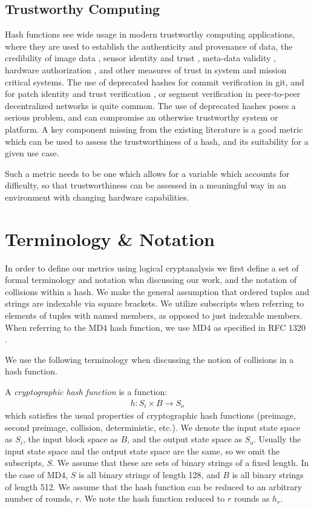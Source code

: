 \documentclass[conference]{IEEEtran}
\begin{document}
\subsection{Trustworthy Computing}

Hash functions see wide usage in modern trustworthy computing
applications, where they are used to establish the authenticity and
provenance of data, the credibility of image data
\cite{friedman1993trustworthy}, sensor identity and trust
\cite{wong2006dynamic}, meta-data validity \cite{bayer1993improving},
hardware authorization \cite{sirer2011logical}, and other measures of
trust in system and mission critical systems.
The use of deprecated hashes for commit verification in
git\cite{loeliger2012version}, and for patch identity and trust
verification \cite{kuhn2005secure}, or segment verification in
peer-to-peer decentralized networks \cite{lua2005survey} is quite
common.  The use of deprecated hashes poses a serious problem, and can
compromise an otherwise trustworthy system or platform.  A key
component missing from the existing literature is a good metric which
can be used to assess the trustworthiness of a hash, and its
suitability for a given use case.

Such a metric needs to be one which allows for a variable which
accounts for difficulty, so that trustworthiness can be assessed in a
meaningful way in an environment with changing hardware capabilities.

\section{Terminology \& Notation}  \label{Sec:Terminology}

In order to define our metrics using logical cryptanalysis
we first define a set of formal terminology and notation whn
discussing our work, and the notation of collisions within a hash.
We make the general assumption that ordered tuples and strings are
indexable via square brackets. We utilize subscripts when referring to
elements of tuples with named members, as opposed to just indexable
members.  When referring to the MD4 hash function, we use MD4 as
specified in RFC 1320 \cite{rfc1320}.

We use the following terminology when discussing the notion of collisions in
a hash function.

A \textit{cryptographic hash function} is a function:
\begin{align*}
  h: S_{i} \times B \rightarrow S_{o}
\end{align*}
which satisfies the usual properties of cryptographic hash functions
(preimage, second preimage, collision, deterministic, etc.). We denote
the input state space as $S_{i}$, the input block space as $B$, and the
output state space as $S_{o}$. Usually the input state space and the
output state space are the same, so we omit the subscripts, $S$. We
assume that these are sets of binary strings of a fixed length. In the
case of MD4, $S$ is all binary strings of length 128, and $B$ is all
binary strings of length 512. We assume that the hash function can be
reduced to an arbitrary number of rounds, $r$. We note the hash
function reduced to $r$ rounds as $h_{r}$.
\end{document}
